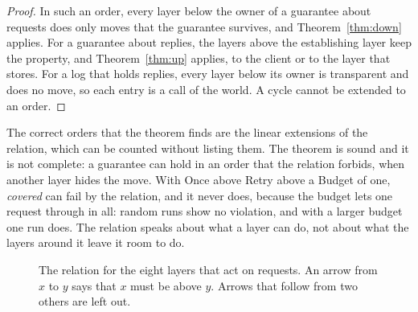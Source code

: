 \documentclass[acmsmall,nonacm,screen]{acmart}
\newcommand{\ly}[1]{\textsf{#1}}
\newcommand{\claim}[2]{#2}
\begin{document}
\begin{proof}
In such an order, every layer below the owner of a guarantee about requests does only moves
that the guarantee survives, and Theorem~\ref{thm:down} applies. For a guarantee about
replies, the layers above the establishing layer keep the property, and
Theorem~\ref{thm:up} applies, to the client or to the layer that stores. For a log that holds
replies, every layer below its owner is transparent and does no move, so each entry is a
call of the world. A cycle cannot be extended to an order.
\end{proof}

The correct orders that the theorem finds are the linear extensions of the relation, which
can be counted without listing them. The theorem is sound and it is not complete: a guarantee
can hold in an order that the relation forbids, when another layer hides the move.
\claim{masked}{With \ly{Once} above \ly{Retry} above a \ly{Budget} of one, \emph{covered}
can fail by the relation, and it never does, because the budget lets one request through in
all: \exMaskedRuns{} random runs show no violation, and with a larger budget one run
does.} The relation speaks about what a layer can do, not about what the layers around it
leave it room to do.

\begin{figure}
\centering
{}
\caption{The relation for the eight layers that act on requests. An arrow from $x$ to $y$
says that $x$ must be above $y$. Arrows that follow from two others are left out.}
\label{fig:order}
\end{figure}
\end{document}
